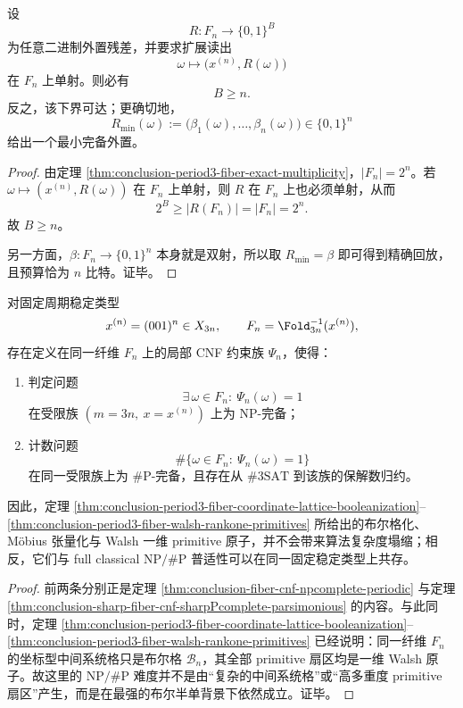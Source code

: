 \begin{theorem}[周期三纤维的精确回放最小外置预算]\label{thm:conclusion-period3-fiber-minimal-external-budget}
设
\[
R:F_n\to\{0,1\}^B
\]
为任意二进制外置残差，并要求扩展读出
\[
\omega\longmapsto \bigl(x^{(n)},R(\omega)\bigr)
\]
在 \(F_n\) 上单射。则必有
\[
B\ge n.
\]
反之，该下界可达；更确切地，
\[
R_{\min}(\omega):=\bigl(\beta_1(\omega),\dots,\beta_n(\omega)\bigr)\in\{0,1\}^n
\]
给出一个最小完备外置。
\end{theorem}
\begin{proof}
由定理 \ref{thm:conclusion-period3-fiber-exact-multiplicity}，\(|F_n|=2^n\)。若
\(
\omega\mapsto (x^{(n)},R(\omega))
\)
在 \(F_n\) 上单射，则 \(R\) 在 \(F_n\) 上也必须单射，从而
\[
2^B\ge |R(F_n)|=|F_n|=2^n.
\]
故 \(B\ge n\)。

另一方面，\(\beta:F_n\to\{0,1\}^n\) 本身就是双射，所以取 \(R_{\min}=\beta\) 即可得到精确回放，且预算恰为 \(n\) 比特。证毕。
\end{proof}

\begin{theorem}\label{thm:conclusion-period3-fiber-boolean-semisimple-npsharp-universality}
对固定周期稳定类型
\[
x^{(n)}=(001)^n\in X_{3n},
\qquad
F_n=\Fold_{3n}^{-1}(x^{(n)}),
\]
存在定义在同一纤维 \(F_n\) 上的局部 CNF 约束族 \(\Psi_n\)，使得：
\begin{enumerate}
  \item 判定问题
  \[
  \exists\,\omega\in F_n:\ \Psi_n(\omega)=1
  \]
  在受限族 \((m=3n,\ x=x^{(n)})\) 上为 \(\mathrm{NP}\)-完备；
  \item 计数问题
  \[
  \#\{\omega\in F_n:\ \Psi_n(\omega)=1\}
  \]
  在同一受限族上为 \(\#\mathrm P\)-完备，且存在从 \(\#3\mathrm{SAT}\) 到该族的保解数归约。
\end{enumerate}
因此，定理 \ref{thm:conclusion-period3-fiber-coordinate-lattice-booleanization}--\ref{thm:conclusion-period3-fiber-walsh-rankone-primitives} 所给出的布尔格化、Möbius 张量化与 Walsh 一维 primitive 原子，并不会带来算法复杂度塌缩；相反，它们与 full classical \(\mathrm{NP}/\#\mathrm P\) 普适性可以在同一固定稳定类型上共存。
\end{theorem}
\begin{proof}
前两条分别正是定理 \ref{thm:conclusion-fiber-cnf-npcomplete-periodic} 与定理 \ref{thm:conclusion-sharp-fiber-cnf-sharpPcomplete-parsimonious} 的内容。与此同时，定理 \ref{thm:conclusion-period3-fiber-coordinate-lattice-booleanization}--\ref{thm:conclusion-period3-fiber-walsh-rankone-primitives} 已经说明：同一纤维 \(F_n\) 的坐标型中间系统格只是布尔格 \(\mathcal B_n\)，其全部 primitive 扇区均是一维 Walsh 原子。故这里的 \(\mathrm{NP}/\#\mathrm P\) 难度并不是由“复杂的中间系统格”或“高多重度 primitive 扇区”产生，而是在最强的布尔半单背景下依然成立。证毕。
\end{proof}

